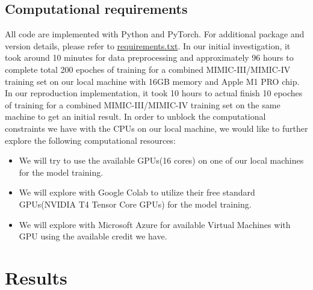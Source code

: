 \documentclass[11pt,a4paper,fleqn]{article}
\begin{document}
\subsection{Computational requirements}
All code are implemented with Python and PyTorch. For additional package and version details, please refer to \href{https://github.com/willtsai/dlh-sp23-team53/blob/main/requirements.txt}{requirements.txt}. In our initial investigation, it took around 10 minutes for data preprocessing and approximately 96 hours to complete 
total 200 epoches of training for a combined MIMIC-III/MIMIC-IV training set on our local machine with 16GB memory and Apple M1 PRO chip. In our reproduction implementation, it took 10 hours to actual finish 10 epoches of training for a combined MIMIC-III/MIMIC-IV training set on the same machine to get an initial result. 
In order to unblock the computational constraints we have with the CPUs on our local machine, we would like to further explore the following computational resources:
\begin{itemize}
  \item We will try to use the available GPUs(16 cores) on one of our local machines for the model training.
  \item We will explore with Google Colab to utilize their free standard GPUs(NVIDIA T4 Tensor Core GPUs) for the model training.
  \item We will explore with Microsoft Azure for available Virtual Machines with GPU using the available credit we have.
\end{itemize}

\section{Results}
\end{document}
